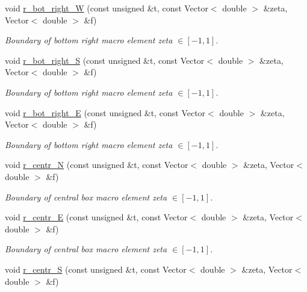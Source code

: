 \begin{DoxyCompactItemize}
void \hyperlink{classoomph_1_1QuarterCircleSectorDomain_a85ba295aaeff2833644691978deac247}{r\+\_\+bot\+\_\+right\+\_\+W} (const unsigned \&t, const Vector$<$ double $>$ \&zeta, Vector$<$ double $>$ \&f)
\begin{DoxyCompactList}\small\item\em Boundary of bottom right macro element zeta $ \in [-1,1] $. \end{DoxyCompactList}\item 
void \hyperlink{classoomph_1_1QuarterCircleSectorDomain_a552f9bfc6fd451669f44ee02c8bb0d38}{r\+\_\+bot\+\_\+right\+\_\+S} (const unsigned \&t, const Vector$<$ double $>$ \&zeta, Vector$<$ double $>$ \&f)
\begin{DoxyCompactList}\small\item\em Boundary of bottom right macro element zeta $ \in [-1,1] $. \end{DoxyCompactList}\item 
void \hyperlink{classoomph_1_1QuarterCircleSectorDomain_abb05f2e719d81f167fc0f608e80c5696}{r\+\_\+bot\+\_\+right\+\_\+E} (const unsigned \&t, const Vector$<$ double $>$ \&zeta, Vector$<$ double $>$ \&f)
\begin{DoxyCompactList}\small\item\em Boundary of bottom right macro element zeta $ \in [-1,1] $. \end{DoxyCompactList}\item 
void \hyperlink{classoomph_1_1QuarterCircleSectorDomain_a1cb12e9b1d2e17f8bd5c3d6691be3b1d}{r\+\_\+centr\+\_\+N} (const unsigned \&t, const Vector$<$ double $>$ \&zeta, Vector$<$ double $>$ \&f)
\begin{DoxyCompactList}\small\item\em Boundary of central box macro element zeta $ \in [-1,1] $. \end{DoxyCompactList}\item 
void \hyperlink{classoomph_1_1QuarterCircleSectorDomain_ae4558d37a4f9bb3f9d78b6878cb77a49}{r\+\_\+centr\+\_\+E} (const unsigned \&t, const Vector$<$ double $>$ \&zeta, Vector$<$ double $>$ \&f)
\begin{DoxyCompactList}\small\item\em Boundary of central box macro element zeta $ \in [-1,1] $. \end{DoxyCompactList}\item 
void \hyperlink{classoomph_1_1QuarterCircleSectorDomain_aaa17ff1d6529000f8309005396966830}{r\+\_\+centr\+\_\+S} (const unsigned \&t, const Vector$<$ double $>$ \&zeta, Vector$<$ double $>$ \&f)

\end{DoxyCompactItemize}
